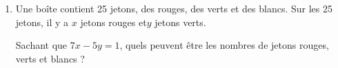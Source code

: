 \begin{colonne*exercice}
\begin{exercice}
\begin{enumerate}
\vspace{-\baselineskip}
\begin{enumerate}
\item Vérifier que le couple (3 ; 4) est solution de (E).
\item Montrer que le couple d'entiers $(x ; y)$ est solution de (E) si, et seulement si, $7(x - 3) = 5(y - 4)$.
\item Montrer que les solutions entières de l’équation (E) sont
  exactement les couples $(x ; y)$ d’entiers\linebreak relatifs tels que :
$$\left\{\begin{aligned}
&x = 5k + 3\\
&y = 7k + 4\end{aligned}\right.\enskip \text{où}\enskip k\in\Z.$$
\end{enumerate}
\item Une boîte contient 25 jetons, des rouges, des verts et des
  blancs. Sur les 25 jetons, il y a $x$ jetons rouges et\linebreak $y$
  jetons verts. 

  Sachant que $7x-5y = 1$, quels peuvent être les nombres de jetons
  rouges, verts et blancs ?
\end{enumerate}
\end{exercice}


\end{colonne*exercice}